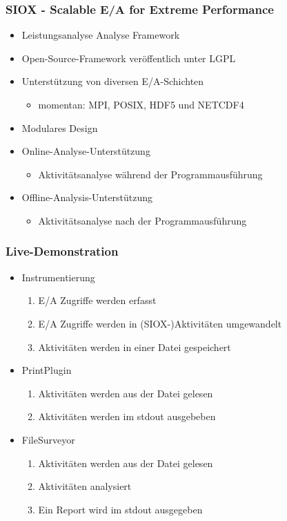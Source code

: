 \begin{frame}
	\frametitle{SIOX - Scalable E/A for Extreme Performance}
	\begin{itemize}
		\item Leistungsanalyse Analyse Framework
		\item Open-Source-Framework veröffentlich unter LGPL
		\item Unterstützung von diversen E/A-Schichten
			\begin{itemize}
				\item momentan: MPI, POSIX, HDF5 und NETCDF4
			\end{itemize}
		\item Modulares Design
		\item Online-Analyse-Unterstützung
			\begin{itemize}
				\item Aktivitätsanalyse während der Programmausführung
			\end{itemize}
		\item Offline-Analysis-Unterstützung
			\begin{itemize}
				\item Aktivitätsanalyse nach der Programmausführung
			\end{itemize}
	\end{itemize}
\end{frame}

\begin{frame}
	\frametitle{Live-Demonstration}
	\begin{itemize}
		\item Instrumentierung
			\begin{enumerate}
				\item E/A Zugriffe werden erfasst
				\item E/A Zugriffe werden in (SIOX-)Aktivitäten umgewandelt
				\item Aktivitäten werden in einer Datei gespeichert
			\end{enumerate}
		\item PrintPlugin
			\begin{enumerate}
				\item Aktivitäten werden aus der Datei gelesen
				\item Aktivitäten werden im stdout ausgebeben
			\end{enumerate}
		\item FileSurveyor
			\begin{enumerate}
				\item Aktivitäten werden aus der Datei gelesen
				\item Aktivitäten analysiert
				\item Ein Report wird im stdout ausgegeben
			\end{enumerate}
	\end{itemize}
\end{frame}


